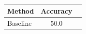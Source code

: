 \documentclass[11pt]{article}
\begin{document}
\begin{tabular}{lcc}
  \toprule
  Method & Accuracy \\
  \midrule
  Baseline & 50.0 \\
  \bottomrule
\end{tabular}
\end{document}
